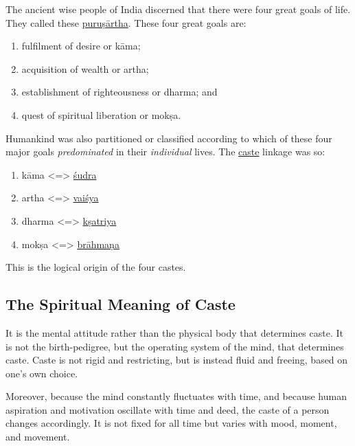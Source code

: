 \documentclass[
  a4paper,
]{article}
\begin{document}
The ancient wise people of India discerned that there were four great
goals of life. They called these
\href{https://en.wikipedia.org/wiki/Puru\%E1\%B9\%A3\%C4\%81rtha}{puruṣārtha}.
These four great goals are:

\begin{enumerate}
\item
  fulfilment of desire or kāma;
\item
  acquisition of wealth or artha;
\item
  establishment of righteousness or dharma; and
\item
  quest of spiritual liberation or mokṣa.
\end{enumerate}

Humankind was also partitioned or classified according to which of these
four major goals \emph{predominated} in their \emph{individual} lives.
The \href{https://en.wikipedia.org/wiki/Caste}{caste} linkage was so:

\begin{enumerate}
\def\labelenumi{\arabic{enumi}.}
\item
  kāma \textless=\textgreater{}
  \href{https://en.wikipedia.org/wiki/Shudra}{śudra}
\item
  artha \textless=\textgreater{}
  \href{https://en.wikipedia.org/wiki/Vaishya}{vaiśya}
\item
  dharma \textless=\textgreater{}
  \href{https://en.wikipedia.org/wiki/Kshatriya}{kṣatriya}
\item
  mokṣa \textless=\textgreater{}
  \href{https://en.wikipedia.org/wiki/Brahmin}{brāhmaṇa}
\end{enumerate}

This is the logical origin of the four castes.

\subsection{The Spiritual Meaning of
Caste}\label{the-spiritual-meaning-of-caste}

It is the mental attitude rather than the physical body that determines
caste. It is not the birth-pedigree, but the operating system of the
mind, that determines caste. Caste is not rigid and restricting, but is
instead fluid and freeing, based on one's own choice.

Moreover, because the mind constantly fluctuates with time, and because
human aspiration and motivation oscillate with time and deed, the caste
of a person changes accordingly. It is not fixed for all time but varies
with mood, moment, and movement.
\end{document}
